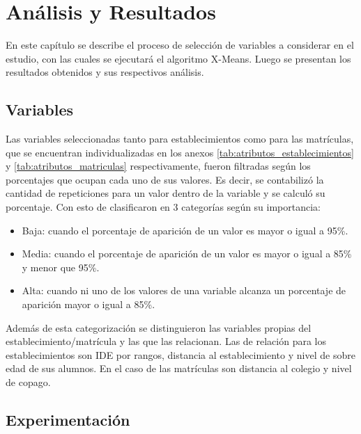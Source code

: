 \chapter{Análisis y Resultados}

En este capítulo se describe el proceso de selección de variables a considerar en el estudio,  con las cuales se ejecutará el algoritmo X-Means. Luego se presentan los resultados obtenidos y sus respectivos análisis.

\section{Variables}
Las variables seleccionadas tanto para establecimientos como para las matrículas, que se encuentran individualizadas en los anexos \ref{tab:atributos_establecimientos} y \ref{tab:atributos_matriculas} respectivamente, fueron filtradas según los porcentajes que ocupan cada uno de sus valores. Es decir, se contabilizó la cantidad de repeticiones para un valor dentro de la variable y se calculó su porcentaje. Con esto de clasificaron en 3 categorías según su importancia:


\begin{itemize}
    \item Baja: cuando el porcentaje de aparición de un valor es mayor o igual a 95\%. 
    \item Media: cuando el porcentaje de aparición de un valor es mayor o igual a 85\% y menor que 95\%.
    \item Alta: cuando ni uno de los valores de una variable alcanza un porcentaje de aparición mayor o igual a 85\%.
\end{itemize}

Además de esta categorización se distinguieron las variables propias del establecimiento/matrícula y las que las relacionan. Las de relación para los establecimientos son IDE por rangos, distancia al establecimiento y nivel de sobre edad de sus alumnos. En el caso de las matrículas son distancia al colegio y nivel de copago.

\section{Experimentación}

